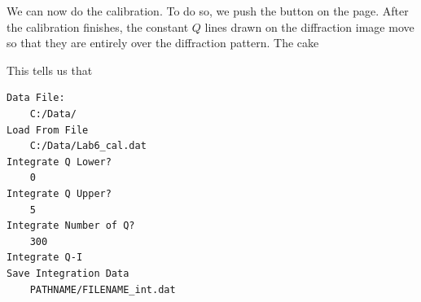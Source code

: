 We can now do the calibration. To do so, we push
the  button on the 
page. After the calibration finishes, the constant
$Q$ lines drawn on the diffraction image move
so that they are entirely over the diffraction 
pattern. The cake 

This tells us that 


\begin{lstlisting}[caption={'A macro to automate the 
    analysis'}]
Data File:
	C:/Data/
Load From File
    C:/Data/Lab6_cal.dat
Integrate Q Lower?
	0
Integrate Q Upper?
	5
Integrate Number of Q?
	300
Integrate Q-I
Save Integration Data
    PATHNAME/FILENAME_int.dat
\end{lstlisting}

